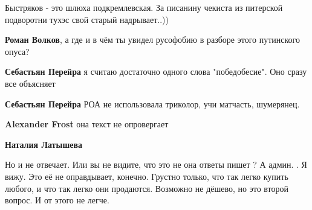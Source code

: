 \begin{itemize}
\begin{itemize}
Быстряков - это шлюха подкремлевская. За писанину чекиста из питерской подворотни тухэс свой старый надрывает..))

 
\textbf{Роман Волков}, а где и в чём ты увидел русофобию в разборе этого путинского опуса?

 
\textbf{Себастьян Перейра} я считаю достаточно одного слова "победобесие". Оно сразу все объясняет

 
\textbf{Себастьян Перейра} РОА не использовала триколор, учи матчасть, шумерянец.

 
\textbf{Alexander Frost} она текст не опровергает

 
\textbf{Наталия Латышева} 

Но и не отвечает. Или вы не видите, что это не она ответы пишет ? А админ. \Smiley[1.0][yellow].
Я вижу. Это её не оправдывает, конечно. Грустно только, что так легко купить
любого, и что так легко они продаются. Возможно не дёшево, но это второй
вопрос. И от этого не легче.


 

\end{itemize}
\end{itemize}

